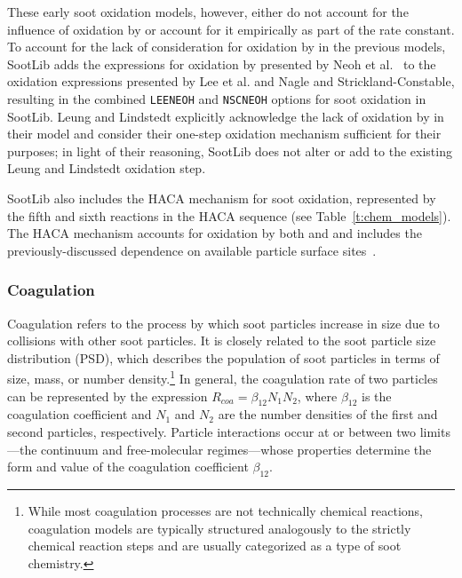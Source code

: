 \documentclass[preprint,letterpaper]{elsarticle}
\begin{document}
These early soot oxidation models, however, either do not account for the influence of oxidation by  or account for it empirically as part of the rate constant. To account for the lack of consideration for oxidation by  in the previous models, SootLib adds the expressions for oxidation by  presented by Neoh et al.~\cite{Neoh_1980,Neoh_1981} to the oxidation expressions presented by Lee et al. and Nagle and Strickland-Constable, resulting in the combined \texttt{LEE\textunderscore NEOH} and \texttt{NSC\textunderscore NEOH} options for soot oxidation in SootLib. Leung and Lindstedt explicitly acknowledge the lack of oxidation by  in their model and consider their one-step oxidation mechanism sufficient for their purposes; in light of their reasoning, SootLib does not alter or add to the existing Leung and Lindstedt oxidation step.

SootLib also includes the HACA mechanism for soot oxidation, represented by the fifth and sixth reactions in the HACA sequence (see Table~\ref{t:chem_models}). The HACA mechanism accounts for oxidation by both  and  and includes the previously-discussed dependence on available particle surface sites~\cite{Appel_2000}.

\subsubsection{Coagulation}
\label{s:coa}

Coagulation refers to the process by which soot particles increase in size due to collisions with other soot particles. It is closely related to the soot particle size distribution (PSD), which describes the population of soot particles in terms of size, mass, or number density.\footnote{While most coagulation processes are not technically chemical reactions, coagulation models are typically structured analogously to the strictly chemical reaction steps and are usually categorized as a type of soot chemistry.}
In general, the coagulation rate of two particles can be represented by the expression $R_{coa}=\beta_{12}N_1N_2$, where $\beta_{12}$ is the coagulation coefficient and $N_1$ and $N_2$ are the number densities of the first and second particles, respectively. Particle interactions occur at or between two limits---the continuum and free-molecular regimes---whose properties determine the form and value of the coagulation coefficient $\beta_{12}$.
\end{document}
